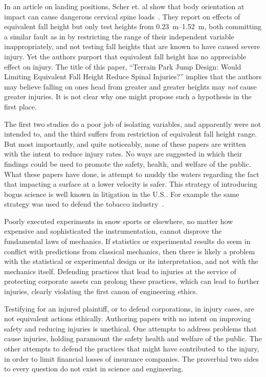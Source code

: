 \documentclass[smallextended]{svjour3}       %
\begin{document}
In an article on landing positions, Scher et. al show that body orientation at
impact can cause dangerous cervical spine loads~\cite{Scher2015}. They report
on effects of equivalent fall height but only test heights from
\SIrange{0.23}{1.52}{\meter}, both committing a similar fault as in by
\cite{Shealy2010} restricting the range of their independent variable
inappropriately, and not testing fall heights that are known to have caused
severe injury. Yet the authors purport that equivalent fall height has no
appreciable effect on injury. The title of this paper, ``Terrain Park Jump
Design: Would Limiting Equivalent Fall Height Reduce Spinal Injuries?'' implies
that the authors may believe falling on ones head from greater and greater
heights may \emph{not} cause greater injuries. It is not clear why one might
propose such a hypothesis in the first place.

The first two studies do a poor job of isolating variables, and apparently were
not intended to, and the third suffers from restriction of equivalent fall
height range. But most importantly, and quite noticeably, none of these papers
are written with the intent to reduce injury rates. No ways are suggested in
which their findings could be used to promote the safety, health, and welfare
of the public. What these papers have done, is attempt to muddy the waters
regarding the fact that impacting a surface at a lower velocity is safer. This
strategy of introducing bogus science is well known in litigation in the U.S..
For example the same strategy was used to defend the tobacco
industry~\cite{Oreskes2010}.

Poorly executed experiments in snow sports or elsewhere, no matter how
expensive and sophisticated the instrumentation, cannot disprove the
fundamental laws of mechanics. If statistics or experimental results do seem in
conflict with predictions from classical mechanics, then there is likely a
problem with the statistical or experimental design or its interpretation, and
not with the mechanics itself. Defending practices that lead to injuries at the
service of protecting corporate assets can prolong these practices, which can
lead to further injuries, clearly violating the first canon of engineering
ethics.

Testifying for an injured plaintiff, or to defend corporations, in injury
cases, are not equivalent actions ethically. Authoring papers with no intent on
improving safety and reducing injuries is unethical. One attempts to address
problems that cause injuries, holding paramount the safety health and welfare
of the public. The other attempts to defend the practices that might have
contributed to the injury, in order to limit financial losses of insurance
companies. The proverbial two sides to every question do not exist in science
and engineering.
\end{document}
